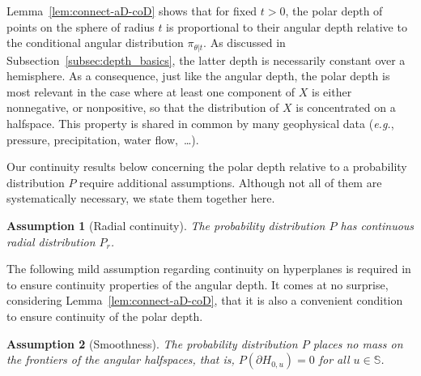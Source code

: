 \documentclass{article}
\numberwithin{equation}{section}
\newtheorem{proposition}{Proposition}[section]
\newtheorem{assumption}{Assumption}[section]
\newcommand{\rset}{\mathbb{R}}
\newcommand{\wto}{\overset{\mathrm{w}}{\to}}
\newcommand{\sphere}{\mathbb{S}}
\newcommand{\coD}[2]{\pD{#1}{#2}}
\begin{document}
Lemma~\ref{lem:connect-aD-coD} shows that for fixed $t>0$, the polar depth of points on the sphere of radius $t$ is proportional to their angular depth relative to  the conditional angular distribution $\pi_{\theta|t}$. As discussed in Subsection~\ref{subsec:depth_basics}, the latter depth is necessarily constant over a hemisphere. As a consequence, just like the angular depth, the polar depth  is most relevant in
the case where at least one component of $X$ is either nonnegative,
or nonpositive, so that the distribution of $X$ is concentrated on a halfspace. This property  is shared in common by many
geophysical data (\textit{e.g.}, pressure, precipitation, water flow,~\dots).

Our continuity results below concerning the polar depth relative to a probability distribution $P$ require additional assumptions. Although not all of them are systematically necessary, we state them together here. 

\begin{assumption}[Radial continuity]\label{as:continuousConditionalAngular}
  The probability distribution $P$ has continuous radial distribution $P_r$. 
 
\end{assumption}

The following mild assumption regarding continuity on hyperplanes is required in \cite{nagy2024theoretical} to ensure continuity properties of the angular depth. It comes at no surprise, considering Lemma~\ref{lem:connect-aD-coD}, that it is also a convenient condition to ensure continuity of the polar depth. 
\begin{assumption}[Smoothness]\label{as:smoothnessHalfSpaces} The probability distribution \(P\)
    places no mass on the frontiers
    of the angular halfspaces, that is, \(P(\partial H_{0,u})=0\) for
    all \(u\in\sphere\).
\end{assumption}




\end{document}
